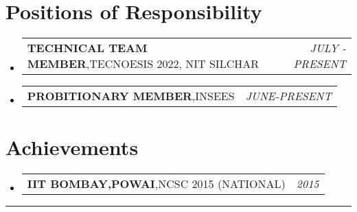 \documentclass[a4paper,11pt]{article}
\makeatletter
\newcommand{\resumePOR}[3]{
\vspace{0.5mm}\item
    \begin{tabular*}{0.97\textwidth}[t]{l@{\extracolsep{\fill}}r}
        \textbf{#1},\hspace{0.3mm}#2 & \textit{\small{#3}} 
    \end{tabular*}
    \vspace{-2mm}
}
\newcommand{\resumeSubHeadingListStart}{\begin{itemize}[leftmargin=*,labelsep=0mm]}
\newcommand{\resumeSubHeadingListEnd}{\end{itemize}\vspace{2mm}}
\makeatother
\begin{document}
\section{Positions of Responsibility}
\vspace{-0.4mm}
\resumeSubHeadingListStart
\resumePOR{TECHNICAL TEAM MEMBER} %
    {TECNOESIS 2022, NIT SILCHAR} %
    {JULY - PRESENT} %
    
\resumePOR{PROBITIONARY MEMBER}
{INSEES}
{JUNE-PRESENT}
\resumeSubHeadingListEnd
\vspace{-4mm}


\section{Achievements}
\vspace{-0.2mm}
\resumeSubHeadingListStart
\resumePOR{IIT BOMBAY,POWAI} 
    {NCSC 2015 (NATIONAL)}
    {2015} %

\resumeSubHeadingListEnd
\hspace*{-5mm}\rule{1.035\textwidth}{0.1mm}


\end{document}

